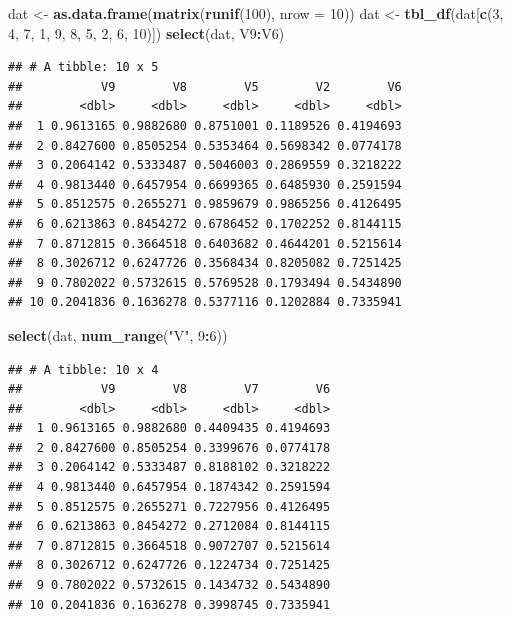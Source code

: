 \documentclass[]{book}
\newenvironment{Shaded}{\begin{snugshade}}{\end{snugshade}}
\newcommand{\KeywordTok}[1]{\textcolor[rgb]{0.13,0.29,0.53}{\textbf{#1}}}
\newcommand{\DataTypeTok}[1]{\textcolor[rgb]{0.13,0.29,0.53}{#1}}
\newcommand{\DecValTok}[1]{\textcolor[rgb]{0.00,0.00,0.81}{#1}}
\newcommand{\StringTok}[1]{\textcolor[rgb]{0.31,0.60,0.02}{#1}}
\newcommand{\OperatorTok}[1]{\textcolor[rgb]{0.81,0.36,0.00}{\textbf{#1}}}
\newcommand{\NormalTok}[1]{#1}
\begin{document}
\begin{Shaded}
\begin{Highlighting}[]
\NormalTok{dat <-}\StringTok{ }\KeywordTok{as.data.frame}\NormalTok{(}\KeywordTok{matrix}\NormalTok{(}\KeywordTok{runif}\NormalTok{(}\DecValTok{100}\NormalTok{), }\DataTypeTok{nrow =} \DecValTok{10}\NormalTok{))}
\NormalTok{dat <-}\StringTok{ }\KeywordTok{tbl_df}\NormalTok{(dat[}\KeywordTok{c}\NormalTok{(}\DecValTok{3}\NormalTok{, }\DecValTok{4}\NormalTok{, }\DecValTok{7}\NormalTok{, }\DecValTok{1}\NormalTok{, }\DecValTok{9}\NormalTok{, }\DecValTok{8}\NormalTok{, }\DecValTok{5}\NormalTok{, }\DecValTok{2}\NormalTok{, }\DecValTok{6}\NormalTok{, }\DecValTok{10}\NormalTok{)])}
\KeywordTok{select}\NormalTok{(dat, V9}\OperatorTok{:}\NormalTok{V6)}
\end{Highlighting}
\end{Shaded}

\begin{verbatim}
## # A tibble: 10 x 5
##           V9        V8        V5        V2        V6
##        <dbl>     <dbl>     <dbl>     <dbl>     <dbl>
##  1 0.9613165 0.9882680 0.8751001 0.1189526 0.4194693
##  2 0.8427600 0.8505254 0.5353464 0.5698342 0.0774178
##  3 0.2064142 0.5333487 0.5046003 0.2869559 0.3218222
##  4 0.9813440 0.6457954 0.6699365 0.6485930 0.2591594
##  5 0.8512575 0.2655271 0.9859679 0.9865256 0.4126495
##  6 0.6213863 0.8454272 0.6786452 0.1702252 0.8144115
##  7 0.8712815 0.3664518 0.6403682 0.4644201 0.5215614
##  8 0.3026712 0.6247726 0.3568434 0.8205082 0.7251425
##  9 0.7802022 0.5732615 0.5769528 0.1793494 0.5434890
## 10 0.2041836 0.1636278 0.5377116 0.1202884 0.7335941
\end{verbatim}

\begin{Shaded}
\begin{Highlighting}[]
\KeywordTok{select}\NormalTok{(dat, }\KeywordTok{num_range}\NormalTok{(}\StringTok{"V"}\NormalTok{, }\DecValTok{9}\OperatorTok{:}\DecValTok{6}\NormalTok{))}
\end{Highlighting}
\end{Shaded}

\begin{verbatim}
## # A tibble: 10 x 4
##           V9        V8        V7        V6
##        <dbl>     <dbl>     <dbl>     <dbl>
##  1 0.9613165 0.9882680 0.4409435 0.4194693
##  2 0.8427600 0.8505254 0.3399676 0.0774178
##  3 0.2064142 0.5333487 0.8188102 0.3218222
##  4 0.9813440 0.6457954 0.1874342 0.2591594
##  5 0.8512575 0.2655271 0.7227956 0.4126495
##  6 0.6213863 0.8454272 0.2712084 0.8144115
##  7 0.8712815 0.3664518 0.9072707 0.5215614
##  8 0.3026712 0.6247726 0.1224734 0.7251425
##  9 0.7802022 0.5732615 0.1434732 0.5434890
## 10 0.2041836 0.1636278 0.3998745 0.7335941
\end{verbatim}
\end{document}
